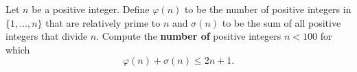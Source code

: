 Let $n$ be a positive integer. Define $\varphi(n)$ to be the number of positive integers in $\{1,\dots,n\}$ that are relatively prime to $n$ and $\sigma(n)$ to be the sum of all positive integers that divide $n$. Compute the \textbf{number of} positive integers $n<100$ for which
\[
	\varphi(n)+\sigma(n)\leq2n+1.
\]
